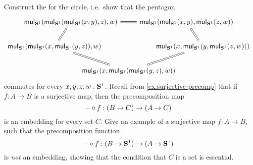 \begin{exercises}
\begin{subexenum}
  \end{subexenum}
  \exercise Construct the  for the circle, i.e.~show that the pentagon
  \begin{equation*}
    \begin{tikzcd}[column sep=-6em]
      &[-6em] \mulcircle(\mulcircle(\mulcircle(x,y),z),w) \arrow[rr,equals] \arrow[dl,equals] & & \mulcircle(\mulcircle(x,y),\mulcircle(z,w)) \arrow[dr,equals] &[-6em] \\
      \mulcircle(\mulcircle(x,\mulcircle(y,z)),w) \arrow[drr,equals] & & & & \mulcircle(x,\mulcircle(y,\mulcircle(z,w))) \\
      & & \mulcircle(x,\mulcircle(\mulcircle(y,z),w)) \arrow[urr,equals]
    \end{tikzcd}
  \end{equation*}
  commutes for every $x,y,z,w:\mathbf{S}^{1}$.
  \exercise Recall from \cref{ex:surjective-precomp} that if $f:A\to B$ is a surjective map, then the precomposition map
  \begin{equation*}
    \mathord{\hspace{1pt}\text{--}\hspace{1pt}}\circ f : (B\to C)\to (A\to C)
  \end{equation*}
  is an embedding for every set $C$. 
  Give an example of a surjective map $f:A\to B$, such that the precomposition function
    \begin{equation*}
      \mathord{\hspace{1pt}\text{--}\hspace{1pt}}\circ f:(B\to \mathbf{S}^{1})\to (A\to \mathbf{S}^{1})
    \end{equation*}
    is \emph{not} an embedding, showing that the condition that $C$ is a set is essential.
\end{exercises}

